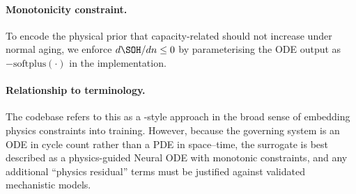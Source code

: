 \paragraph{Monotonicity constraint.}
To encode the physical prior that capacity-related \SOH should not increase
under normal aging, we enforce $d\SOH/dn \le 0$ by parameterising the ODE output
as $-\mathrm{softplus}(\cdot)$ in the implementation.

\paragraph{Relationship to \pinn terminology.}
The codebase refers to this as a \pinn-style approach in the broad sense of
embedding physics constraints into training. However, because the governing
system is an ODE in cycle count rather than a PDE in space--time, the surrogate
is best described as a physics-guided Neural ODE with monotonic constraints,
and any additional ``physics residual'' terms must be justified against
validated mechanistic models.

